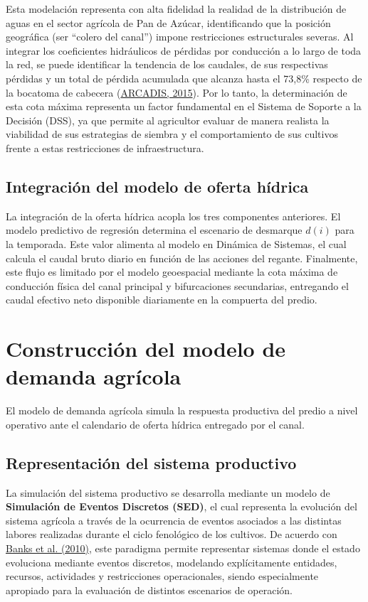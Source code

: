 \documentclass[12pt]{report}
\newcommand{\citeref}[2]{\hyperlink{ref:#1}{#2}}
\begin{document}
Esta modelación representa con alta fidelidad la realidad de la distribución de aguas en el sector agrícola de Pan de Azúcar, identificando que la posición geográfica (ser ``colero del canal'') impone restricciones estructurales severas. Al integrar los coeficientes hidráulicos de pérdidas por conducción a lo largo de toda la red, se puede identificar la tendencia de los caudales, de sus respectivas pérdidas y un total de pérdida acumulada que alcanza hasta el 73,8\% respecto de la bocatoma de cabecera (\citeref{arcadis2015}{ARCADIS, 2015}). Por lo tanto, la determinación de esta cota máxima representa un factor fundamental en el Sistema de Soporte a la Decisión (DSS), ya que permite al agricultor evaluar de manera realista la viabilidad de sus estrategias de siembra y el comportamiento de sus cultivos frente a estas restricciones de infraestructura.

\subsection{Integración del modelo de oferta hídrica}

La integración de la oferta hídrica acopla los tres componentes anteriores. El modelo predictivo de regresión determina el escenario de desmarque $d(i)$ para la temporada. Este valor alimenta al modelo en Dinámica de Sistemas, el cual calcula el caudal bruto diario en función de las acciones del regante. Finalmente, este flujo es limitado por el modelo geoespacial mediante la cota máxima de conducción física del canal principal y bifurcaciones secundarias, entregando el caudal efectivo neto disponible diariamente en la compuerta del predio.

\section{Construcción del modelo de demanda agrícola}

El modelo de demanda agrícola simula la respuesta productiva del predio a nivel operativo ante el calendario de oferta hídrica entregado por el canal.

\subsection{Representación del sistema productivo}

La simulación del sistema productivo se desarrolla mediante un modelo de \textbf{Simulación de Eventos Discretos (SED)}, el cual representa la evolución del sistema agrícola a través de la ocurrencia de eventos asociados a las distintas labores realizadas durante el ciclo fenológico de los cultivos. De acuerdo con \citeref{banks2010}{Banks et al. (2010)}, este paradigma permite representar sistemas donde el estado evoluciona mediante eventos discretos, modelando explícitamente entidades, recursos, actividades y restricciones operacionales, siendo especialmente apropiado para la evaluación de distintos escenarios de operación.
\end{document}
